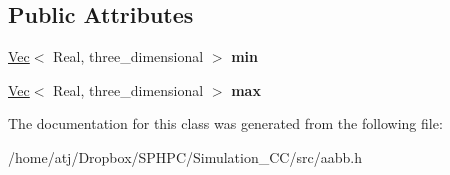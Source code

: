 \subsection*{Public Attributes}
\begin{DoxyCompactItemize}
\item 
\hypertarget{classAABB_3_01Real_00_01three__dimensional_01_4_a94bd63d979c7cdb4ebc061131309dd37}{}\hyperlink{structVec}{Vec}$<$ Real, three\+\_\+dimensional $>$ {\bfseries min}\label{classAABB_3_01Real_00_01three__dimensional_01_4_a94bd63d979c7cdb4ebc061131309dd37}

\item 
\hypertarget{classAABB_3_01Real_00_01three__dimensional_01_4_a6aafd1c321e46a76831a702af4ea9157}{}\hyperlink{structVec}{Vec}$<$ Real, three\+\_\+dimensional $>$ {\bfseries max}\label{classAABB_3_01Real_00_01three__dimensional_01_4_a6aafd1c321e46a76831a702af4ea9157}

\end{DoxyCompactItemize}


The documentation for this class was generated from the following file\+:\begin{DoxyCompactItemize}
\item 
/home/atj/\+Dropbox/\+S\+P\+H\+P\+C/\+Simulation\+\_\+\+C\+C/src/aabb.\+h\end{DoxyCompactItemize}
